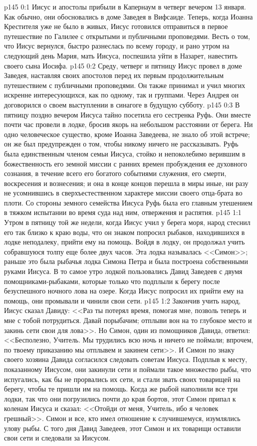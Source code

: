 \vs p145 0:1 Иисус и апостолы прибыли в Капернаум в четверг вечером 13 января. Как обычно, они обосновались в доме Заведея в Вифсаиде. Теперь, когда Иоанна Крестителя уже не было в живых, Иисус готовился отправиться в первое путешествие по Галилее с открытыми и публичными проповедями. Весть о том, что Иисус вернулся, быстро разнеслась по всему городу, и рано утром на следующий день Мария, мать Иисуса, поспешила уйти в Назарет, навестить своего сына Иосифа.
\vs p145 0:2 Среду, четверг и пятницу Иисус провел в доме Заведея, наставляя своих апостолов перед их первым продолжительным путешествием с публичными проповедями. Он также принимал и учил многих искренне интересующихся, как по одному, так и группами. Через Андрея он договорился о своем выступлении в синагоге в будущую субботу.
\vs p145 0:3 В пятницу поздно вечером Иисуса тайно посетила его сестренка Руфь. Они вместе почти час провели в лодке, бросив якорь на небольшом расстоянии от берега. Ни одно человеческое существо, кроме Иоанна Заведеева, не знало об этой встрече; он же был предупрежден о том, чтобы никому ничего не рассказывать. Руфь была единственным членом семьи Иисуса, стойко и непоколебимо верившим в божественность его земной миссии с ранних времен пробуждения ее духовного сознания, в течение всего его богатого событиями служения, его смерти, воскресения и вознесения; и она в конце концов перешла в миры иные, ни разу не усомнившись в сверхъестественном характере миссии своего отца\hyp{}брата во плоти. Со стороны земного семейства Иисуса Руфь была его главным утешением в тяжком испытании во время суда над ним, отвержения и распятия.
\vs p145 1:1 Утром в пятницу той же недели, когда Иисус учил у берега моря, народ стеснил его так близко к краю воды, что он знаком попросил рыбаков, находившихся в лодке неподалеку, прийти ему на помощь. Войдя в лодку, он продолжал учить собравшуюся толпу еще более двух часов. Эта лодка называлась <<Симон>>; раньше это была рыбачья лодка Симона Петра и была построена собственными руками Иисуса. В то самое утро лодкой пользовались Давид Заведеев с двумя помощниками\hyp{}рыбаками, которые только что подплыли к берегу после безуспешного ночного лова на озере. Когда Иисус попросил их прийти ему на помощь, они промывали и чинили свои сети.
\vs p145 1:2 Закончив учить народ, Иисус сказал Давиду: <<Раз ты потерял время, помогая мне, позволь теперь и мне с тобой потрудиться. Давай порыбачим; отплыви вон на то глубокое место и закинь сети свои для лова>>. Но Симон, один из помощников Давида, ответил:<<Бесполезно, Учитель. Мы трудились всю ночь и ничего не поймали; впрочем, по твоему приказанию мы отплывем и закинем сети>>. И Симон по знаку своего хозяина Давида согласился следовать советам Иисуса. Подплыв к месту, показанному Иисусом, они закинули сети и поймали такое множество рыбы, что испугались, как бы не прорвались их сети, и стали звать своих товарищей на берегу, чтобы те пришли им на помощь. Когда же рыбой наполнили все три лодки, так что они погрузились почти до края бортов, этот Симон припал к коленам Иисуса и сказал: <<Отойди от меня, Учитель, ибо я человек грешный>>. Симон и все, кто имел отношение к случившемуся, изумлялись улову рыбы. С того дня Давид Заведеев, этот Симон и их товарищи оставили свои сети и следовали за Иисусом.
